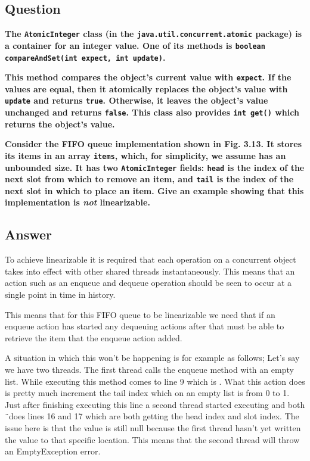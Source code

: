 \documentclass{article}
\begin{document}
\subsection*{Question}
\textbf{The \texttt{AtomicInteger} class (in the \texttt{java.util.concurrent.atomic} package) is a container for an integer value. One of its methods is \texttt{boolean compareAndSet(int expect, int update)}.}

\textbf{This method compares the object's current value with \texttt{expect}. If the values are equal, then it atomically replaces the object's value with \texttt{update} and returns \texttt{true}. Otherwise, it leaves the object's value unchanged and returns \texttt{false}. This class also provides \texttt{int get()} which returns the object's value.}

\textbf{Consider the FIFO queue implementation shown in Fig. 3.13. It stores its items in an array \texttt{items}, which, for simplicity, we assume has an unbounded size. It has two \texttt{AtomicInteger} fields: \texttt{head} is the index of the next slot from which to remove an item, and \texttt{tail} is the index of the next slot in which to place an item. Give an example showing that this implementation is \textit{not} linearizable.}


\subsection*{Answer}
To achieve linearizable it is required that each operation on a concurrent object takes into effect with other shared threads instantaneously. This means that an action such as an enqueue and dequeue operation should be seen to occur at a single point in time in history.

This means that for this FIFO queue to be linearizable we need that if an enqueue action has started any dequeuing actions after that must be able to retrieve the item that the enqueue action added.

A situation in which this won't be happening is for example as follows; Let's say we have two threads. The first thread calls the enqueue method with an empty list. While executing this method comes to line 9 which is . What this action does is pretty much increment the tail index which on an empty list is from 0 to 1. Just after finishing executing this line a second thread started executing and both ¨does lines 16 and 17 which are both getting the head index and slot index. The issue here is that the value is still null because the first thread hasn't yet written the value to that specific location. This means that the second thread will throw an EmptyException error.
\end{document}
